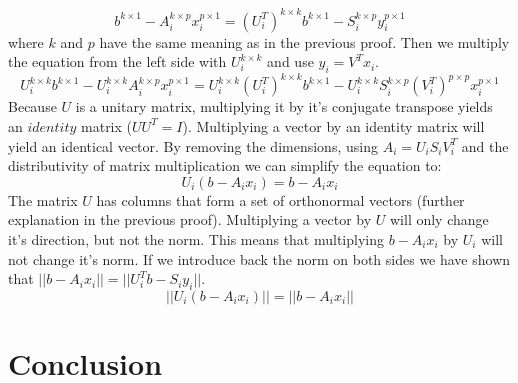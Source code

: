 \documentclass[12pt]{article}
\begin{document}
\[
b^{k \times 1} - A_i^{k \times p} x_i^{p \times 1} = (U_i^{T})^{k \times k}b^{k \times 1} - S_i^{k \times p}y_i^{p \times 1}
\]
\newline
where $k$ and $p$ have the same meaning as in the previous proof. Then we multiply the equation from the left side with $U_i^{k \times k}$ and use $y_i = V^Tx_i$. \\

\[
U_i^{k \times k}b^{k \times 1} - U_i^{k \times k}A_i^{k \times p} x_i^{p \times 1} = U_i^{k \times k}(U_i^{T})^{k \times k}b^{k \times 1} - U_i^{k \times k}S_i^{k \times p}(V_i^{T})^{p \times p}x_i^{p \times 1}
\]
\newline
Because $U$ is a unitary matrix, multiplying it by it's conjugate transpose yields an $identity$ matrix ($UU^T = I$). Multiplying a vector by an identity matrix will yield an identical vector. By removing the dimensions, using $A_i = U_iS_iV_i^{T}$ and the distributivity of matrix multiplication we can simplify the equation to: \\

\[
U_i(b - A_ix_i) = b - A_ix_i
\]
\newline
The matrix $U$ has columns that form a set of orthonormal vectors (further explanation in the previous proof). Multiplying a vector by $U$ will only change it's direction, but not the norm. This means that multiplying $b - A_ix_i$ by $U_i$ will not change it's norm. If we introduce back the norm on both sides we have shown that $||b - A_ix_i|| = ||U_i^{T}b - S_iy_i||$. \\
\[
||U_i(b - A_ix_i)|| = ||b - A_ix_i||
\]

\newpage
\section{Conclusion}
\end{document}
